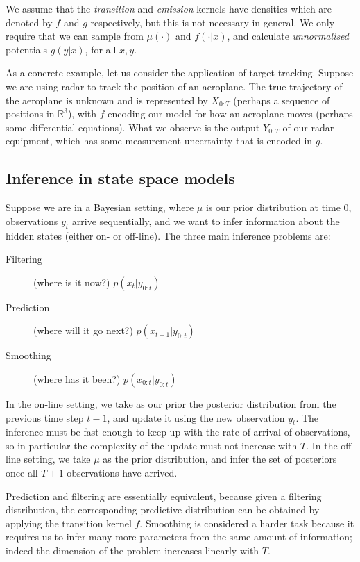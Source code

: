\documentclass[fleqn]{article}
\theoremstyle{definition}
\begin{document}
We assume that the \emph{transition} and \emph{emission} kernels have densities which are denoted by $f$ and $g$ respectively, but this is not necessary in general.
We only require that we can sample from $\mu(\cdot)$ and $f(\cdot | x)$, and calculate \emph{unnormalised} potentials $g(y|x)$, for all $x,y$.

As a concrete example, let us consider the application of target tracking. Suppose we 
are using radar to track the position of an aeroplane. The true trajectory of the aeroplane is unknown and is represented by $X_{0:T}$ (perhaps a sequence of positions in $\mathbb{R}^3$), with $f$ encoding our model for how an aeroplane moves (perhaps some differential equations). What we observe is the output $Y_{0:T}$ of our radar equipment, which has some measurement uncertainty that is encoded in $g$.

\subsection{Inference in state space models}
Suppose we are in a Bayesian setting, where $\mu$ is our prior distribution at time 0, observations $y_t$ arrive sequentially, and we want to infer information about the hidden states (either on- or off-line).
The three main inference problems are:
\begin{description}
\item[Filtering] (where is it now?) $p(x_{t} | y_{0:t})$
\item[Prediction] (where will it go next?) $p(x_{t+1} | y_{0:t})$
\item[Smoothing] (where has it been?) $p(x_{0:t} | y_{0:t})$
\end{description}
In the on-line setting, we take as our prior the posterior distribution from the previous time step $t-1$, and update it using the new observation $y_t$. The inference must be fast enough to keep up with the rate of arrival of observations, so in particular the complexity of the update must not increase with $T$.
In the off-line setting, we take $\mu$ as the prior distribution, and infer the set of posteriors once all $T+1$ observations have arrived.

Prediction and filtering are essentially equivalent, because given a filtering distribution, the corresponding predictive distribution can be obtained by applying the transition kernel $f$.
Smoothing is considered a harder task because it requires us to infer many more parameters from the same amount of information; indeed the dimension of the problem increases linearly with $T$.
\end{document}
